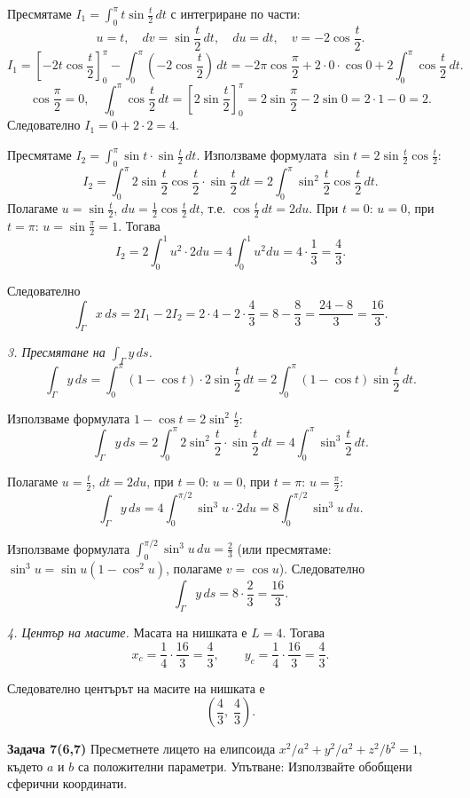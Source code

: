 \documentclass[10pt]{article}
\begin{document}
Пресмятаме $I_1 = \int_0^\pi t\sin\frac{t}{2}\,dt$ с интегриране по части:
\[
u = t,\quad dv = \sin\frac{t}{2}\,dt,\quad du = dt,\quad v = -2\cos\frac{t}{2}.
\]
\[
I_1 = \left[-2t\cos\frac{t}{2}\right]_0^\pi - \int_0^\pi (-2\cos\frac{t}{2})\,dt = -2\pi\cos\frac{\pi}{2} + 2\cdot0\cdot\cos0 + 2\int_0^\pi \cos\frac{t}{2}\,dt.
\]
\[
\cos\frac{\pi}{2} = 0,\quad \int_0^\pi \cos\frac{t}{2}\,dt = \left[2\sin\frac{t}{2}\right]_0^\pi = 2\sin\frac{\pi}{2} - 2\sin0 = 2\cdot1 - 0 = 2.
\]
Следователно $I_1 = 0 + 2\cdot2 = 4$.

Пресмятаме $I_2 = \int_0^\pi \sin t \cdot \sin\frac{t}{2}\,dt$. Използваме формулата $\sin t = 2\sin\frac{t}{2}\cos\frac{t}{2}$:
\[
I_2 = \int_0^\pi 2\sin\frac{t}{2}\cos\frac{t}{2} \cdot \sin\frac{t}{2}\,dt = 2\int_0^\pi \sin^2\frac{t}{2} \cos\frac{t}{2}\,dt.
\]
Полагаме $u = \sin\frac{t}{2}$, $du = \frac12\cos\frac{t}{2}\,dt$, т.е. $\cos\frac{t}{2}\,dt = 2du$. При $t=0$: $u=0$, при $t=\pi$: $u=\sin\frac{\pi}{2}=1$. Тогава
\[
I_2 = 2\int_0^1 u^2 \cdot 2du = 4\int_0^1 u^2 du = 4\cdot\frac{1}{3} = \frac{4}{3}.
\]

Следователно
\[
\int_\Gamma x\,ds = 2I_1 - 2I_2 = 2\cdot4 - 2\cdot\frac{4}{3} = 8 - \frac{8}{3} = \frac{24-8}{3} = \frac{16}{3}.
\]

\textit{3. Пресмятане на $\int_\Gamma y\,ds$.}
\[
\int_\Gamma y\,ds = \int_0^\pi (1-\cos t) \cdot 2\sin\frac{t}{2}\,dt = 2\int_0^\pi (1-\cos t)\sin\frac{t}{2}\,dt.
\]

Използваме формулата $1-\cos t = 2\sin^2\frac{t}{2}$:
\[
\int_\Gamma y\,ds = 2\int_0^\pi 2\sin^2\frac{t}{2} \cdot \sin\frac{t}{2}\,dt = 4\int_0^\pi \sin^3\frac{t}{2}\,dt.
\]

Полагаме $u = \frac{t}{2}$, $dt = 2du$, при $t=0$: $u=0$, при $t=\pi$: $u=\frac{\pi}{2}$:
\[
\int_\Gamma y\,ds = 4\int_0^{\pi/2} \sin^3 u \cdot 2du = 8\int_0^{\pi/2} \sin^3 u\,du.
\]

Използваме формулата $\int_0^{\pi/2} \sin^3 u\,du = \frac{2}{3}$ (или пресмятаме: $\sin^3u = \sin u(1-\cos^2u)$, полагаме $v=\cos u$). Следователно
\[
\int_\Gamma y\,ds = 8\cdot\frac{2}{3} = \frac{16}{3}.
\]

\textit{4. Център на масите.}
Масата на нишката е $L = 4$. Тогава
\[
x_c = \frac{1}{4} \cdot \frac{16}{3} = \frac{4}{3}, \qquad y_c = \frac{1}{4} \cdot \frac{16}{3} = \frac{4}{3}.
\]

Следователно центърът на масите на нишката е
\[
\boxed{\left(\frac{4}{3},\; \frac{4}{3}\right)}.
\]


\textbf{Задача 7(6,7) }Пресметнете лицето на елипсоида $x^2/a^2 + y^2/a^2 + z^2/b^2 = 1$, където $a$ и $b$ са положителни параметри. Упътване: Използвайте обобщени сферични координати. 
\end{document}
